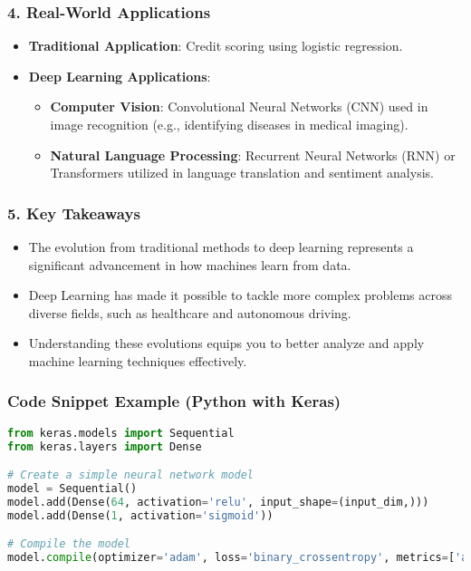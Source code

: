 \documentclass[aspectratio=169]{beamer}
\begin{document}
\begin{frame}
    \frametitle{4. Real-World Applications}
    \begin{itemize}
        \item \textbf{Traditional Application}: Credit scoring using logistic regression.
        \item \textbf{Deep Learning Applications}:
        \begin{itemize}
            \item \textbf{Computer Vision}: Convolutional Neural Networks (CNN) used in image recognition (e.g., identifying diseases in medical imaging).
            \item \textbf{Natural Language Processing}: Recurrent Neural Networks (RNN) or Transformers utilized in language translation and sentiment analysis.
        \end{itemize}
    \end{itemize}
\end{frame}

\begin{frame}[fragile]
    \frametitle{5. Key Takeaways}
    \begin{itemize}
        \item The evolution from traditional methods to deep learning represents a significant advancement in how machines learn from data.
        \item Deep Learning has made it possible to tackle more complex problems across diverse fields, such as healthcare and autonomous driving.
        \item Understanding these evolutions equips you to better analyze and apply machine learning techniques effectively.
    \end{itemize}
\end{frame}

\begin{frame}[fragile]
    \frametitle{Code Snippet Example (Python with Keras)}
    \begin{lstlisting}[language=Python]
from keras.models import Sequential
from keras.layers import Dense

# Create a simple neural network model
model = Sequential()
model.add(Dense(64, activation='relu', input_shape=(input_dim,)))
model.add(Dense(1, activation='sigmoid'))

# Compile the model
model.compile(optimizer='adam', loss='binary_crossentropy', metrics=['accuracy'])
    \end{lstlisting}
\end{frame}
\end{document}
